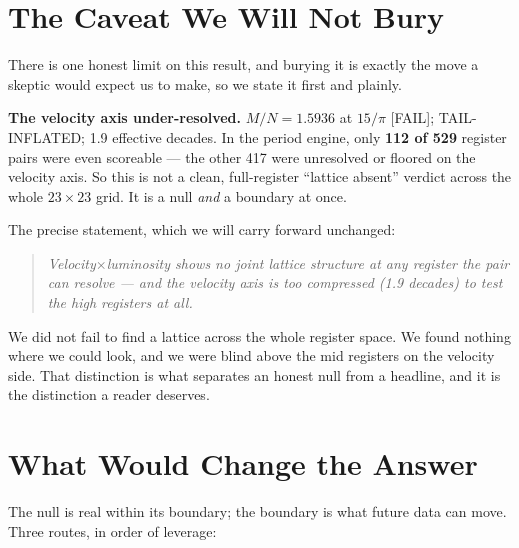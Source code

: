 \documentclass[11pt, letterpaper, openany]{book}
\begin{document}
\section{The Caveat We Will Not Bury}

There is one honest limit on this result, and burying it is exactly the move a skeptic would
expect us to make, so we state it first and plainly.

\begin{correctionbox}
\textbf{The velocity axis under-resolved.} $M/N = 1.5936$ at $15/\pi$ [FAIL]; TAIL-INFLATED; 1.9
effective decades. In the period engine, only \textbf{112 of 529} register pairs were even
scoreable --- the other 417 were unresolved or floored on the velocity axis. So this is not a
clean, full-register ``lattice absent'' verdict across the whole $23\times23$ grid. It is a null
\emph{and} a boundary at once.
\end{correctionbox}

The precise statement, which we will carry forward unchanged:

\begin{quote}
\itshape
Velocity$\times$luminosity shows no joint lattice structure at any register the pair can resolve
--- and the velocity axis is too compressed (1.9 decades) to test the high registers at all.
\end{quote}

We did not fail to find a lattice across the whole register space. We found nothing where we could
look, and we were blind above the mid registers on the velocity side. That distinction is what
separates an honest null from a headline, and it is the distinction a reader deserves.

\section{What Would Change the Answer}

The null is real within its boundary; the boundary is what future data can move. Three routes, in
order of leverage:
\end{document}
